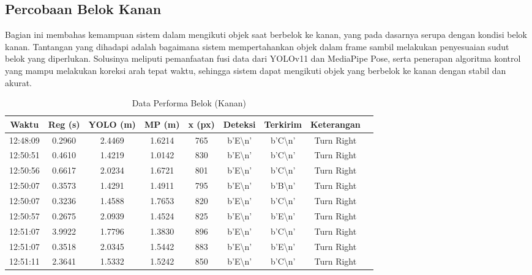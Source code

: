 \newpage
\subsection{Percobaan Belok Kanan}
\label{subsec:percobaanbelokkanan}

Bagian ini membahas kemampuan sistem dalam mengikuti objek saat berbelok ke kanan, yang pada dasarnya serupa dengan kondisi belok kanan. Tantangan yang dihadapi adalah bagaimana sistem mempertahankan objek dalam frame sambil melakukan penyesuaian sudut belok yang diperlukan. Solusinya meliputi pemanfaatan fusi data dari YOLOv11 dan MediaPipe Pose, serta penerapan algoritma kontrol yang mampu melakukan koreksi arah tepat waktu, sehingga sistem dapat mengikuti objek yang berbelok ke kanan dengan stabil dan akurat.

\begin{table}[H]
    \centering
    \caption{Data Performa Belok (Kanan)}
    \label{tab:performa_belok_kanan}
    \begin{tabular}{|c|c|c|c|c|c|c|c|c|}
    \hline
    Waktu & Reg (s) & YOLO (m) & MP (m) & x (px) & Deteksi & Terkirim & Keterangan \\ \hline
    12:48:09 & 0.2960 & 2.4469 & 1.6214 & 765 & b'E\textbackslash n' & b'C\textbackslash n' & Turn Right \\ \hline
    12:50:51 & 0.4610 & 1.4219 & 1.0142 & 830 & b'E\textbackslash n' & b'C\textbackslash n' & Turn Right \\ \hline
    12:50:56 & 0.6617 & 2.0234 & 1.6721 & 801 & b'E\textbackslash n' & b'C\textbackslash n' & Turn Right \\ \hline
    12:50:07 & 0.3573 & 1.4291 & 1.4911 & 795 & b'E\textbackslash n' & b'B\textbackslash n' & Turn Right \\ \hline
    12:50:07 & 0.3236 & 1.4588 & 1.7653 & 820 & b'E\textbackslash n' & b'C\textbackslash n' & Turn Right \\ \hline
    12:50:57 & 0.2675 & 2.0939 & 1.4524 & 825 & b'E\textbackslash n' & b'E\textbackslash n' & Turn Right \\ \hline
    12:51:07 & 3.9922 & 1.7796 & 1.3830 & 896 & b'E\textbackslash n' & b'C\textbackslash n' & Turn Right \\ \hline
    12:51:07 & 0.3518 & 2.0345 & 1.5442 & 883 & b'E\textbackslash n' & b'E\textbackslash n' & Turn Right \\ \hline
    12:51:11 & 2.3641 & 1.5332 & 1.5242 & 850 & b'E\textbackslash n' & b'C\textbackslash n' & Turn Right \\ \hline

\end{tabular}
\end{table}
